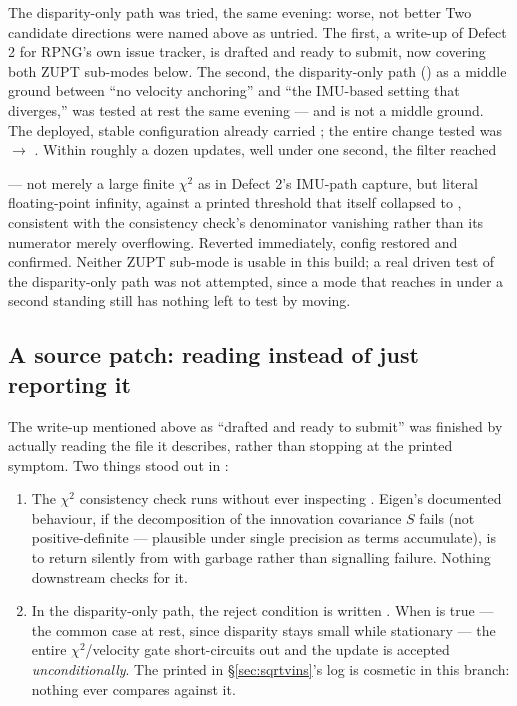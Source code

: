 \begin{trapbox}{The disparity-only path was tried, the same evening: worse, not better}
Two candidate directions were named above as untried. The first, a
write-up of Defect 2 for RPNG's own issue tracker, is drafted and ready
to submit, now covering both ZUPT sub-modes below. The second, the
disparity-only path () as a middle
ground between ``no velocity anchoring'' and ``the IMU-based setting
that diverges,'' was tested at rest the same evening --- and is not a
middle ground. The deployed, stable configuration already carried
; the entire change tested was
 $\to$ . Within roughly a dozen
updates, well under one second, the filter reached
\begin{center}
\end{center}
--- not merely a large finite $\chi^2$ as in Defect 2's IMU-path
capture, but literal floating-point infinity, against a printed
threshold that itself collapsed to , consistent with the
consistency check's denominator vanishing rather than its numerator
merely overflowing. Reverted immediately, config restored and
confirmed. Neither ZUPT sub-mode is usable in this build; a real
driven test of the disparity-only path was not attempted, since a
mode that reaches  in under a second standing still has
nothing left to test by moving.
\end{trapbox}

\subsection{A source patch: reading  instead of just reporting it}
\label{sec:sqrtvins-patch}

The write-up mentioned above as ``drafted and ready to submit'' was
finished by actually reading the file it describes, rather than
stopping at the printed symptom. Two things stood out in
:

\begin{enumerate}
\item The $\chi^2$ consistency check runs 
  without ever inspecting . Eigen's documented
  behaviour, if the  decomposition of the innovation
  covariance $S$ fails (not positive-definite --- plausible under
  single precision as terms accumulate), is to return silently from
   with garbage rather than signalling failure.
  Nothing downstream checks for it.
\item In the disparity-only path, the reject condition is written
  . When  is true --- the common case
  at rest, since disparity stays small while stationary --- the
  entire $\chi^2$/velocity gate short-circuits out and the update is
  accepted \emph{unconditionally}. The printed
   in \S\ref{sec:sqrtvins}'s log is cosmetic
  in this branch: nothing ever compares against it.
\end{enumerate}


